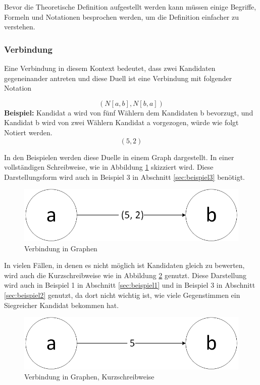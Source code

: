 Bevor die Theoretische Definition aufgestellt werden kann müssen einige Begriffe, Formeln und Notationen besprochen werden, um die Definition einfacher zu verstehen.


\subsubsection{Verbindung}
\label{verbindung}
Eine Verbindung in diesem Kontext bedeutet, dass zwei Kandidaten gegeneinander antreten und diese Duell ist eine Verbindung mit folgender Notation

\[
(N[a,b],N[b,a])
\]
\textbf{Beispiel:}
Kandidat a wird von fünf Wählern dem Kandidaten b bevorzugt, und Kandidat b wird von zwei Wählern Kandidat a vorgezogen, würde wie folgt Notiert werden. 
\[
(5,2)
\]

In den Beispielen werden diese Duelle in einem Graph dargestellt. In einer vollständigen Schreibweise, wie in Abbildung \ref{fig:verbindung1} skizziert wird. Diese Darstellungsform wird auch in Beispiel 3 in Abschnitt \ref{sec:beispiel3} benötigt.

\begin{figure}[!h]
\centering
\includegraphics[scale=0.5]{Bilder/Definitionab.png}
\caption{Verbindung in Graphen}
\label{fig:verbindung1}
\end{figure}

In vielen Fällen, in denen es nicht möglich ist Kandidaten gleich zu bewerten, wird auch die Kurzschreibweise wie in Abbildung \ref{fig:verbindung2} genutzt. Diese Darstellung wird auch in Beispiel 1 in Abschnitt \ref{sec:beispiel1} und in Beispiel 3 in Abschnitt \ref{sec:beispiel2} genutzt, da dort nicht wichtig ist, wie viele Gegenstimmen ein Siegreicher Kandidat bekommen hat.

\begin{figure}[!h]
\centering
\includegraphics[scale=0.5]{Bilder/DefinitionShortab.png}
\caption{Verbindung in Graphen, Kurzschreibweise}
\label{fig:verbindung2}
\end{figure}



